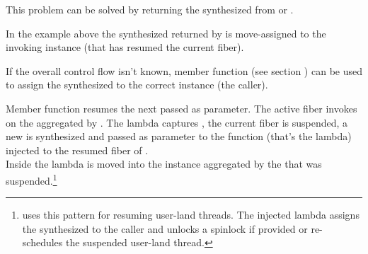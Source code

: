 This problem can be solved by returning the synthesized \fiber from  \resume or
\resumewith. 

In the example above the synthesized \fiber returned by \resume is
move-assigned to the invoking \fiber instance (that has resumed the current
fiber).\\

\xspace\newline

If the overall control flow isn't known, member function \resumewith (see section
) can be used to assign the synthesized \fiber to the correct \fiber
instance (the caller).

Member function  resumes the next  passed as
parameter. The active fiber invokes \resumewith on the \fiber aggregated by
. The lambda captures , the current fiber is suspended, a
new \fiber is synthesized and passed as parameter  to the function
(that's the lambda) injected to the resumed fiber of .\\
Inside the lambda  is moved into the instance  aggregated by the
 that was suspended.\footnote{\bfiber\cite{bfiber} uses this 
pattern for resuming user-land threads.
The injected lambda assigns the synthesized \fiber to the caller and unlocks a
spinlock if provided or re-schedules the suspended user-land thread.}

